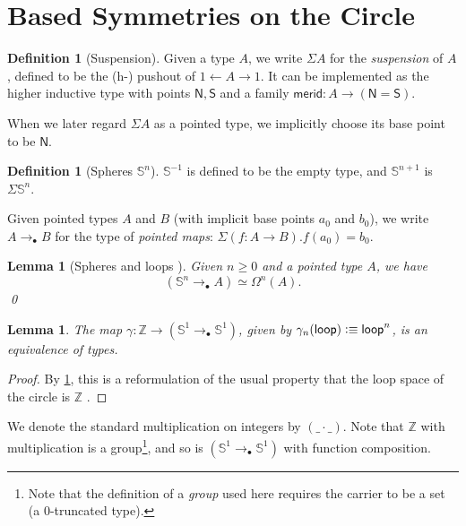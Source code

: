 \documentclass[11pt,a4paper,oneside,reqno]{amsart}
\newtheorem{lemma}[theorem]{Lemma}
\theoremstyle{definition}
\newtheorem{definition}[theorem]{Definition}
\theoremstyle{remark}
\newcommand{\Z}{\mathbb Z}
\newcommand{\sph}[1]{{\mathbb S}^{#1}}
\newcommand{\defeq}{\vcentcolon\equiv}
\newcommand{\North}{\mathsf N}
\newcommand{\South}{\mathsf S}
\newcommand{\merid}{\mathsf{merid}}
\newcommand{\pointedm}{\rightarrow_\bullet}
\newcommand{\lo}{\mathsf{loop}}
\begin{document}
\section{Based Symmetries on the Circle}

\begin{definition}[Suspension]
 Given a type $A$, we write $\Sigma A$ for the \emph{suspension} of $A$, defined to be the (h-) pushout of $1 \leftarrow A \rightarrow 1$.
 It can be implemented as the higher inductive type with points $\North, \South$ and a family $\merid : A \to (\North = \South)$.
\end{definition}

When we later regard $\Sigma A$ as a pointed type, we implicitly choose its base point to be $\North$.

\begin{definition}[Spheres $\sph n$]
 $\sph {-1}$ is defined to be the empty type, and $\sph {n+1}$ is $\Sigma \sph n$.
\end{definition}

Given pointed types $A$ and $B$ (with implicit base points $a_0$ and $b_0$), we write $A \pointedm B$ for the type of \emph{pointed maps}: $\Sigma (f : A \to B). f(a_0) = b_0$.

\begin{lemma}[{Spheres and loops \cite[check-lemma-number]{HoTT}}] \label{lem:sph-loops}
 Given $n \geq 0$ and a pointed type $A$, we have
 \begin{equation}
  (\sph n \pointedm A) \simeq \Omega^n(A).
 \end{equation}
 \qed
\end{lemma}

\begin{lemma}
 The map $\gamma : \Z \to (\sph 1 \pointedm \sph 1)$, given by $\gamma_n (\lo) \defeq \lo^n$, is an equivalence of types.
\end{lemma}
\begin{proof}
 By \cref{lem:sph-loops}, this is a reformulation of the usual property that the loop space of the circle is $\Z$ \cite[Chp 8.1]{HoTT}.
\end{proof}

We denote the standard multiplication on integers by $(\_ \cdot \_)$.
Note that $\Z$ with multiplication is a group\footnote{Note that the definition of a \emph{group} used here requires the carrier to be a set (a $0$-truncated type).}, and so is $(\sph 1 \pointedm \sph 1)$ with function composition.
\end{document}
